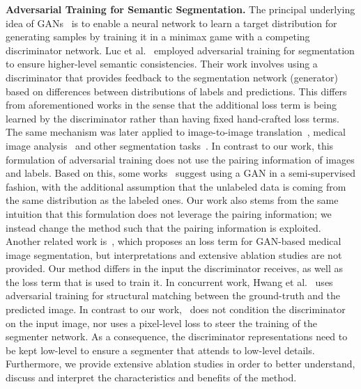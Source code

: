 \documentclass{article} \usepackage{nips13submit_e,times}
\begin{document}
\textbf{Adversarial Training for Semantic Segmentation.}
The principal underlying idea of GANs~\cite{goodfellow2014generative} is to enable a neural network to learn a target distribution for generating samples by training it in a minimax game with a competing discriminator network.
Luc et al.~\cite{luc2016semantic} employed adversarial training for segmentation to ensure higher-level semantic consistencies.
Their work involves using a discriminator that provides feedback to the segmentation network (generator) based on differences between distributions of labels and predictions.
This differs from aforementioned works in the sense that the additional loss term is being learned by the discriminator rather than having fixed hand-crafted loss terms.
The same mechanism was later applied to image-to-image translation~\cite{isola2017image}, medical image analysis~\cite{dai2017scan,huo2017splenomegaly,kohl2017adversarial,moeskops2017adversarial,xue2017segan,yang2017automatic,li2017brain,sadanandan4spheroid} and other segmentation tasks~\cite{nguyen2017shadow}.
In contrast to our work, this formulation of adversarial training does not use the pairing information of images and labels.
Based on this, some works~\cite{zhang2017deep,hung2018adversarial} suggest using a GAN in a semi-supervised fashion, with the additional assumption that the unlabeled data is coming from the same distribution as the labeled ones.
Our work also stems from the same intuition that this formulation does not leverage the pairing information; we instead change the method such that the pairing information is exploited.
Another related work is~\cite{xue2017segan}, which proposes an  loss term for GAN-based medical image segmentation, but interpretations and extensive ablation studies are not provided.
Our method differs in the input the discriminator receives, as well as the loss term that is used to train it.
In concurrent work, Hwang et al.~\cite{hwang2018adversarial} uses adversarial training for structural matching between the ground-truth and the predicted image.
In contrast to our work,~\cite{hwang2018adversarial} does not condition the discriminator on the input image, nor uses a pixel-level loss to steer the training of the segmenter network. 
As a consequence, the discriminator representations need to be kept low-level to ensure a segmenter that attends to low-level details. 
Furthermore, we provide extensive ablation studies in order to better understand, discuss and interpret the characteristics and benefits of the method.
\end{document}
